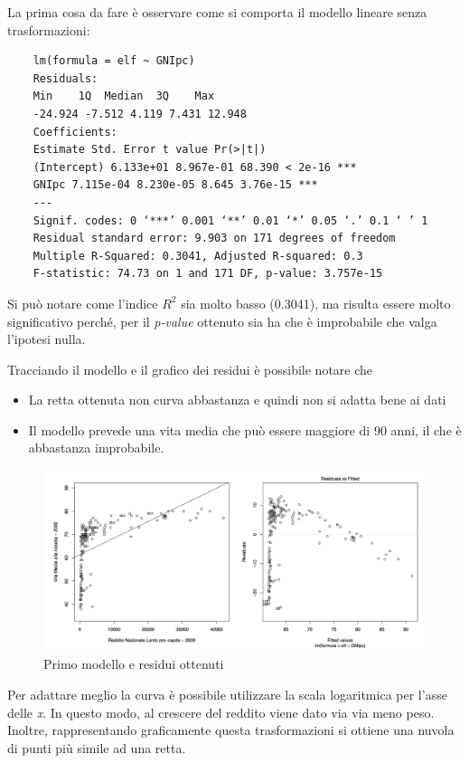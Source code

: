 La prima cosa da fare è osservare come si comporta il modello lineare senza trasformazioni:

\begin{verbatim}
	lm(formula = elf ~ GNIpc)
	Residuals:
	Min    1Q  Median  3Q    Max
	-24.924 -7.512 4.119 7.431 12.948
	Coefficients:
	Estimate Std. Error t value Pr(>|t|)
	(Intercept) 6.133e+01 8.967e-01 68.390 < 2e-16 ***
	GNIpc 7.115e-04 8.230e-05 8.645 3.76e-15 ***
	---
	Signif. codes: 0 ‘***’ 0.001 ‘**’ 0.01 ‘*’ 0.05 ‘.’ 0.1 ‘ ’ 1
	Residual standard error: 9.903 on 171 degrees of freedom 
	Multiple R-Squared: 0.3041, Adjusted R-squared: 0.3 
	F-statistic: 74.73 on 1 and 171 DF, p-value: 3.757e-15
\end{verbatim}

Si può notare come l'indice $ R^2 $ sia molto basso (0.3041), ma risulta essere molto significativo perché, per il \textit{p-value} ottenuto sia ha che è improbabile che valga l'ipotesi nulla.

Tracciando il modello e il grafico dei residui è possibile notare che
\begin{itemize}
	\item La retta ottenuta non curva abbastanza e quindi non si adatta bene ai dati
	\item Il modello prevede una vita media che può essere maggiore di 90 anni, il che è abbastanza improbabile.
\end{itemize}

\begin{figure}[htbp]
	\centering
	\includegraphics[width=.9\textwidth]{./notes/immagini/l7-fig6.png}
	\caption{Primo modello e residui ottenuti}
\end{figure}

Per adattare meglio la curva è possibile utilizzare la scala logaritmica per l'asse delle \textit{x}. In questo modo, al crescere del reddito viene dato via via meno peso.
Inoltre, rappresentando graficamente questa trasformazioni si ottiene una nuvola di punti più simile ad una retta.


